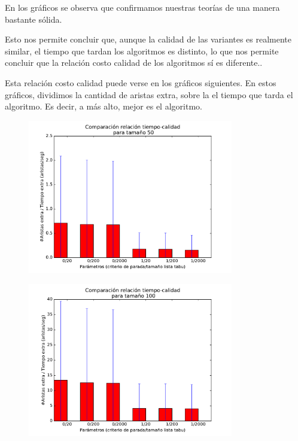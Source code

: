 En los gráficos se observa que confirmamos nuestras teorías de una manera bastante sólida.

Esto nos permite concluir que, aunque la calidad de las variantes es realmente similar, el tiempo que tardan los algoritmos es distinto, lo que nos permite concluir que la relación costo calidad de los algoritmos sí es diferente..

Esta relación costo calidad puede verse en los gráficos siguientes. En estos gráficos, dividimos la cantidad de aristas extra, sobre la el tiempo que tarda el algoritmo. Es decir, a más alto, mejor es el algoritmo.




\begin{figure}[H]
 \centering
	\includegraphics[width=0.8\textwidth]{graficos/problema_6/cociente0.pdf}
	\caption{}
	\label{fig:problema6-cociente0}
\end{figure}

\begin{figure}[H]
 \centering
	\includegraphics[width=0.8\textwidth]{graficos/problema_6/cociente1.pdf}
	\caption{}
	\label{fig:problema6-cociente1}
\end{figure}

